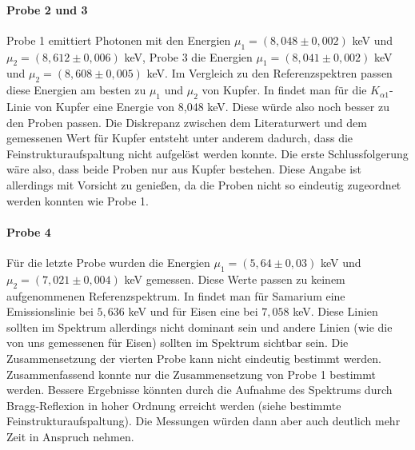 \paragraph{Probe 2 und 3}  Probe 1 emittiert Photonen mit den Energien $\mu_1=(8,048 \pm 0,002)$ keV und $\mu_2= (8,612 \pm 0,006)$ keV, Probe 3 die Energien $\mu_1=(8,041 \pm 0,002)$ keV und $\mu_2=(8,608 \pm 0,005)$ keV. Im Vergleich zu den Referenzspektren passen diese Energien am besten zu $\mu_1$ und $\mu_2$ von Kupfer. In \cite{booklet} findet man für die $K_{\alpha 1}$-Linie von Kupfer eine Energie von 8,048 keV. Diese würde also noch besser zu den Proben passen. Die Diskrepanz zwischen dem Literaturwert und dem gemessenen Wert für Kupfer entsteht unter anderem dadurch, dass die Feinstrukturaufspaltung nicht aufgelöst werden konnte. Die erste Schlussfolgerung wäre also, dass beide Proben nur aus Kupfer bestehen. Diese Angabe ist allerdings mit Vorsicht zu genießen, da die Proben nicht so eindeutig zugeordnet werden konnten wie Probe 1.

\paragraph{Probe 4} Für die letzte Probe wurden die Energien $\mu_1=(5,64 \pm 0,03)$ keV und $\mu_2=(7,021 \pm 0,004)$ keV gemessen. Diese Werte passen zu keinem aufgenommenen Referenzspektrum. In \cite{booklet} findet man für Samarium eine Emissionslinie bei $5,636$ keV und für Eisen eine bei $7,058$ keV. Diese Linien sollten im Spektrum allerdings nicht dominant sein und andere Linien (wie die von uns gemessenen für Eisen) sollten im Spektrum sichtbar sein. Die Zusammensetzung der vierten Probe kann nicht eindeutig bestimmt werden. \\ 

Zusammenfassend konnte nur die Zusammensetzung von Probe 1 bestimmt werden. Bessere Ergebnisse könnten durch die Aufnahme des Spektrums durch Bragg-Reflexion in hoher Ordnung erreicht werden (siehe bestimmte Feinstrukturaufspaltung). Die Messungen würden dann aber auch deutlich mehr Zeit in Anspruch nehmen.

\newpage

